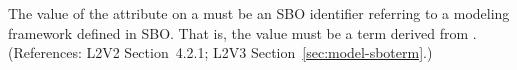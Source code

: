 The value of the  attribute on a \Model must be an SBO
identifier referring to a modeling framework defined in SBO.  That is, the
value must be a term derived from \sboframework.  (References: L2V2
Section~4.2.1; L2V3 Section~\ref{sec:model-sboterm}.)
